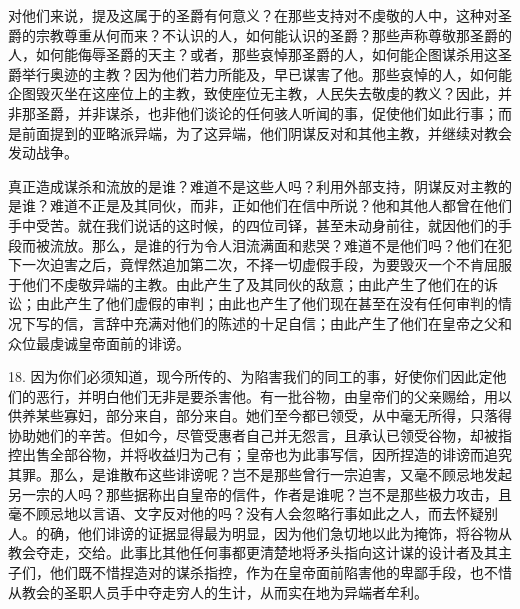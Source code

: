 对他们来说，提及这属于的圣爵有何意义？在那些支持对不虔敬的人中，这种对圣爵的宗教尊重从何而来？不认识的人，如何能认识的圣爵？那些声称尊敬那圣爵的人，如何能侮辱圣爵的天主？或者，那些哀悼那圣爵的人，如何能企图谋杀用这圣爵举行奥迹的主教？因为他们若力所能及，早已谋害了他。那些哀悼的人，如何能企图毁灭坐在这座位上的主教，致使座位无主教，人民失去敬虔的教义？因此，并非那圣爵，并非谋杀，也非他们谈论的任何骇人听闻的事，促使他们如此行事；而是前面提到的亚略派异端，为了这异端，他们阴谋反对和其他主教，并继续对教会发动战争。\par

真正造成谋杀和流放的是谁？难道不是这些人吗？利用外部支持，阴谋反对主教的是谁？难道不正是及其同伙，而非，正如他们在信中所说？他和其他人都曾在他们手中受苦。就在我们说话的这时候，的四位司铎，甚至未动身前往，就因他们的手段而被流放。那么，是谁的行为令人泪流满面和悲哭？难道不是他们吗？他们在犯下一次迫害之后，竟悍然追加第二次，不择一切虚假手段，为要毁灭一个不肯屈服于他们不虔敬异端的主教。由此产生了及其同伙的敌意；由此产生了他们在的诉讼；由此产生了他们虚假的审判；由此也产生了他们现在甚至在没有任何审判的情况下写的信，言辞中充满对他们的陈述的十足自信；由此产生了他们在皇帝之父和众位最虔诚皇帝面前的诽谤。\par

18. 因为你们必须知道，现今所传的、为陷害我们的同工的事，好使你们因此定他们的恶行，并明白他们无非是要杀害他。有一批谷物，由皇帝们的父亲赐给，用以供养某些寡妇，部分来自，部分来自。她们至今都已领受，从中毫无所得，只落得协助她们的辛苦。但如今，尽管受惠者自己并无怨言，且承认已领受谷物，却被指控出售全部谷物，并将收益归为己有；皇帝也为此事写信，因所捏造的诽谤而追究其罪。那么，是谁散布这些诽谤呢？岂不是那些曾行一宗迫害，又毫不顾忌地发起另一宗的人吗？那些据称出自皇帝的信件，作者是谁呢？岂不是那些极力攻击，且毫不顾忌地以言语、文字反对他的吗？没有人会忽略行事如此之人，而去怀疑别人。的确，他们诽谤的证据显得最为明显，因为他们急切地以此为掩饰，将谷物从教会夺走，交给。此事比其他任何事都更清楚地将矛头指向这计谋的设计者及其主子们，他们既不惜捏造对的谋杀指控，作为在皇帝面前陷害他的卑鄙手段，也不惜从教会的圣职人员手中夺走穷人的生计，从而实在地为异端者牟利。\par

